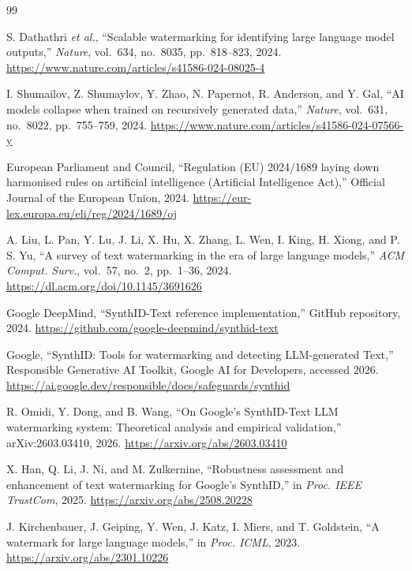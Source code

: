 \documentclass[journal]{IEEEtran}
\begin{document}
\balance
\begin{thebibliography}{99}

S. Dathathri \emph{et al.}, ``Scalable watermarking for identifying large language model outputs,'' \emph{Nature}, vol.~634, no.~8035, pp.~818--823, 2024. \url{https://www.nature.com/articles/s41586-024-08025-4}

I. Shumailov, Z. Shumaylov, Y. Zhao, N. Papernot, R. Anderson, and Y. Gal, ``AI models collapse when trained on recursively generated data,'' \emph{Nature}, vol.~631, no.~8022, pp.~755--759, 2024. \url{https://www.nature.com/articles/s41586-024-07566-y}

European Parliament and Council, ``Regulation (EU) 2024/1689 laying down harmonised rules on artificial intelligence (Artificial Intelligence Act),'' Official Journal of the European Union, 2024. \url{https://eur-lex.europa.eu/eli/reg/2024/1689/oj}

A. Liu, L. Pan, Y. Lu, J. Li, X. Hu, X. Zhang, L. Wen, I. King, H. Xiong, and P. S. Yu, ``A survey of text watermarking in the era of large language models,'' \emph{ACM Comput. Surv.}, vol.~57, no.~2, pp.~1--36, 2024. \url{https://dl.acm.org/doi/10.1145/3691626}

Google DeepMind, ``SynthID-Text reference implementation,'' GitHub repository, 2024. \url{https://github.com/google-deepmind/synthid-text}

Google, ``SynthID: Tools for watermarking and detecting LLM-generated Text,'' Responsible Generative AI Toolkit, Google AI for Developers, accessed 2026. \url{https://ai.google.dev/responsible/docs/safeguards/synthid}

R. Omidi, Y. Dong, and B. Wang, ``On Google's SynthID-Text LLM watermarking system: Theoretical analysis and empirical validation,'' arXiv:2603.03410, 2026. \url{https://arxiv.org/abs/2603.03410}

X. Han, Q. Li, J. Ni, and M. Zulkernine, ``Robustness assessment and enhancement of text watermarking for Google's SynthID,'' in \emph{Proc. IEEE TrustCom}, 2025. \url{https://arxiv.org/abs/2508.20228}

J. Kirchenbauer, J. Geiping, Y. Wen, J. Katz, I. Miers, and T. Goldstein, ``A watermark for large language models,'' in \emph{Proc. ICML}, 2023. \url{https://arxiv.org/abs/2301.10226}


\end{thebibliography}
\end{document}
